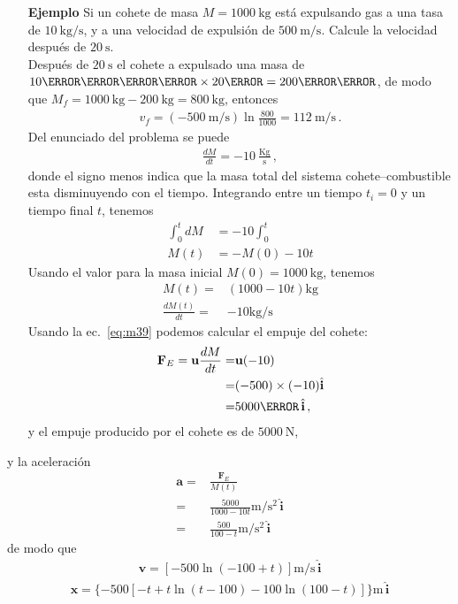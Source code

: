 \begin{itemize}
\item[\textbf{Ejemplo}]Si un cohete de masa $M=\SI{1000}{\kilo\gram}$ está expulsando gas a una tasa de $\SI{10}{\kilo\gram\per\second}$, y a una velocidad de expulsión de $\SI{500}{\meter\per\second}$. Calcule la velocidad después de $\SI{20}{\second}$.\\
Después de $\SI{20}{\second}$ el cohete a expulsado una masa de $\SI{10}{\kilo\gram\per\second}\timesm\SI{20}{\second}=\SI{200}{\kilo\gram}$, de modo que $M_f=\SI{1000}{\kilo\gram}-\SI{200}{\kilo\gram}=\SI{800}{\kilo\gram}$, entonces
\begin{align}
  v_f=(-\SI{500}{\meter\per\second})\ln\frac{800}{1000}=\SI{112}{\meter\per\second}\,.
\end{align}
Del enunciado del problema se puede 
\begin{align}
  \frac{dM}{dt}=-10\ \frac{\text{Kg}}{\text{s}}\,,
\end{align}
donde el signo menos indica que la masa total del sistema cohete--combustible esta disminuyendo con el tiempo. Integrando entre un tiempo $t_i=0$ y un tiempo final $t$, tenemos
\begin{align}
  \int_0^t dM&=-10\int_0^t\nonumber\\
  M(t)&=-M(0)-10 t
\end{align}
Usando el valor para la masa inicial $M(0)=\SI{1000}{\kilo\gram}$, tenemos
\begin{align*}
  M(t)=&{(1000-10t)}\si{\kilo\gram}\nonumber\\
  \frac{dM(t)}{dt}=&-10\si{\kilo\gram\per\second}
\end{align*}
Usando la ec.~\eqref{eq:m39} podemos calcular el empuje del cohete:
\begin{align}
  \mathbf{F}_E=\mathbf{u}\frac{dM}{dt}=&\mathbf{u}(-10)\nonumber\\
  =&(-500)\timesm(-10)\hat{\mathbf{i}}\nonumber\\
  =&\SI{5000}{\newton}\,\hat{\mathbf{i}}\,,
\end{align}
y  el empuje producido por el cohete es de $\SI{5000}{\newton}$,  
\end{itemize}

y la aceleración
\begin{align}
  \mathbf{a}=&\frac{\mathbf{F}_E}{M(t)}\nonumber\\
  =&{\frac{5000}{1000-10t}}\si{\meter\per\second\squared}\,\hat{\mathbf{i}}\nonumber\\
  =&{\frac{500}{100-t}}\si{\meter\per\second\squared}\,\hat{\mathbf{i}}
\end{align}
de modo que
\begin{align}
  \textbf{v}={[-500\ln(-100+t)]}\si{\meter\per\second}\,\hat{\mathbf{i}}
\end{align}
\begin{align}
 \mathbf{x}={\{-500 [-t+t \ln (t-100)-100 \ln (100-t)]\}}\si{\meter}\,\hat{\mathbf{i}}
\end{align}


